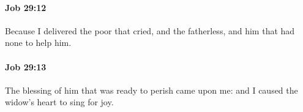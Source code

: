 		\paragraph{Job 29:12} %
			\label{JOB-29-12}

			Because I delivered the poor that cried, and the fatherless, and him that had none to help him.


		\paragraph{Job 29:13} %
			\label{JOB-29-13}

			The blessing of him that was ready to perish came upon me: and I caused the widow’s heart to sing for joy.


